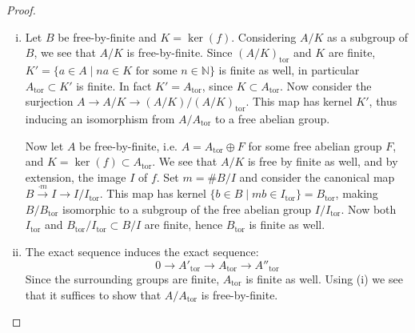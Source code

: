 \begin{proof}
\begin{enumerate}[(i)]
\item Let $B$ be free-by-finite and $K = \ker(f)$. Considering $A/K$ as a subgroup of $B$, we see that $A/K$ is free-by-finite. Since $(A/K)_\text{tor}$ and $K$ are finite, $K' = \{a\in A\mid na\in K \text{ for some }n\in\mathbb{N}\}$ is finite as well, in particular $A_\text{tor}\subset K'$ is finite. In fact $K'=A_\text{tor}$, since $K\subset A_\text{tor}$. Now consider the surjection $A\to A/K\to (A/K)/(A/K)_\text{tor}$. This map has kernel $K'$, thus inducing an isomorphism from $A/A_\text{tor}$ to a free abelian group.

Now let $A$ be free-by-finite, i.e. $A = A_\text{tor} \oplus F$ for some free abelian group $F$, and $K=\ker(f)\subset A_\text{tor}$. We see that $A/K$ is free by finite as well, and by extension, the image $I$ of $f$. Set $m = \#B/I$ and consider the canonical map $B\stackrel{\cdot m}{\to} I \to I/I_\text{tor}$. This map has kernel $\{b\in B \mid mb \in I_\text{tor}\} = B_\text{tor}$, making $B/B_\text{tor}$ isomorphic to a subgroup of the free abelian group $I/I_\text{tor}$. Now both $I_\text{tor}$ and $B_\text{tor}/I_\text{tor} \subset B/I$ are finite, hence $B_\text{tor}$ is finite as well.
\item The exact sequence induces the exact sequence:
\[0 \longrightarrow A'_\text{tor} \longrightarrow A_\text{tor} \longrightarrow A''_\text{tor}\] 
Since the surrounding groups are finite, $A_\text{tor}$ is finite as well. Using (i) we see that it suffices to show that $A/A_\text{tor}$ is free-by-finite. 


\end{enumerate}
\end{proof}
